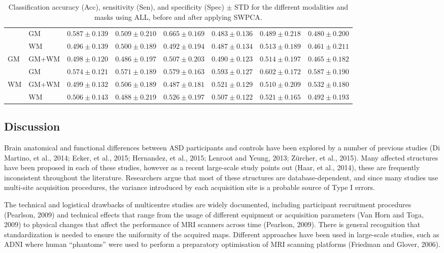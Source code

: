 \begin{table}
\begin{tabularx}{\textwidth}{XX|XXX|XXX}
		&
		GM &
		$ 0.587 \pm 0.139 $ & $ 0.509 \pm 0.210 $ & $ 0.665 \pm 0.169 $ & $ 0.483 \pm 0.136 $ & $ 0.489 \pm 0.218 $ &  $ 0.480 \pm 0.200 $ \\
		&
		WM &
		$ 0.496 \pm 0.139 $ & $ 0.500 \pm 0.189 $ & $ 0.492 \pm 0.194 $ & $ 0.487 \pm 0.134 $ & $ 0.513 \pm 0.189 $ &   $ 0.461 \pm 0.211 $ \\
		\midrule
		\multirow{2}{*}{\ac{GM}} &GM+WM &
		$ 0.498 \pm 0.120 $ & $ 0.486 \pm 0.197 $ & $ 0.507 \pm 0.203 $ & $ 0.490 \pm 0.123 $ & $ 0.514 \pm 0.197 $ &  $ 0.465 \pm 0.182 $ \\
		&
		GM &
		$ 0.574 \pm 0.121 $ & $ 0.571 \pm 0.189 $ & $ 0.579 \pm 0.163 $ & $ 0.593 \pm 0.127 $ & $ 0.602 \pm 0.172 $ &   $ 0.587 \pm 0.190 $ \\
		\midrule
		\multirow{2}{*}{\ac{WM}} &GM+WM &
		$ 0.499 \pm 0.132 $ & $ 0.506 \pm 0.189 $ & $ 0.487 \pm 0.181 $ & $ 0.521 \pm 0.129 $ & $ 0.510 \pm 0.209 $ &  $ 0.532 \pm 0.180 $ \\
		&
		WM &
		$ 0.506 \pm 0.143 $ & $ 0.488 \pm 0.219 $ & $ 0.526 \pm 0.197 $ & $ 0.507 \pm 0.122 $ & $ 0.521 \pm 0.165 $ &   $ 0.492 \pm 0.193 $ \\
		\bottomrule
	\end{tabularx}
	\caption{Classification accuracy (Acc), sensitivity (Sen), and specificity (Spec) $\pm$ STD for the different modalities and masks using ALL, before and after applying \ac{SWPCA}.}
	\label{tab:swpcaALL}
\end{table}

\subsection{Discussion}
Brain anatomical and functional differences between ASD participants and
controls have been explored by a number of previous studies (Di
Martino, et al., 2014; Ecker, et al., 2015; Hernandez, et al., 2015;
Lenroot and Yeung, 2013; Zürcher, et al., 2015). Many affected
structures have been proposed in each of these studies, however as a
recent large-scale study points out (Haar, et al., 2014), these are
frequently inconsistent throughout the literature. Researchers argue
that most of these structures are database-dependent, and since many
studies use multi-site acquisition procedures, the variance introduced
by each acquisition site is a probable source of Type I errors. 


	The technical and logistical drawbacks of multicentre studies are widely
	documented, including participant recruitment procedures (Pearlson,
	2009) and technical effects that range from the usage of different
	equipment or acquisition parameters (Van Horn and Toga, 2009) to
	physical changes that affect the performance of \ac{MRI} scanners across
	time (Pearlson, 2009). There is general recognition that
	standardization is needed to ensure the uniformity of the acquired
	maps. Different approaches have been used in large-scale studies, such
	as \ac{ADNI} where human
	“phantoms” were used to perform a preparatory optimisation of \ac{MRI}
	scanning platforms (Friedman and Glover, 2006). 


